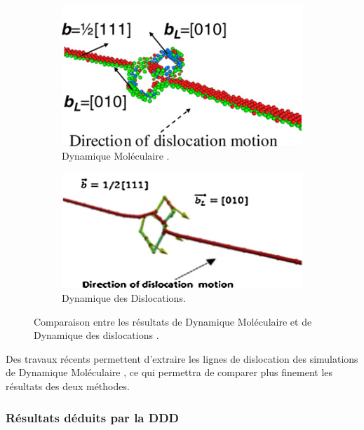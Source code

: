 \documentclass[11pt,class=article,float=false,crop=false]{standalone}
\begin{document}
\begin{figure}[H]
	\centering
	\begin{subfigure}[b]{0.49\textwidth}
		\centering
		\includegraphics[height=0.15\textheight]{img/comparaison-xshi-md}
		\caption[Dynamique Moléculaire]{Dynamique Moléculaire .}
	\end{subfigure}
	\begin{subfigure}[b]{0.49\textwidth}
		\centering
		\includegraphics[height=0.15\textheight]{img/comparaison-xshi-dd}
		\caption{Dynamique des Dislocations.}
	\end{subfigure}
	\caption[Comparaisons DD / MD]{Comparaison entre les résultats de Dynamique Moléculaire et de Dynamique des dislocations .}
	\label{fig:comparaison_md}
\end{figure}

Des travaux récents permettent d'extraire les lignes de dislocation des simulations de Dynamique Moléculaire , ce qui permettra de comparer plus finement les résultats des deux méthodes.

\subsubsection{Résultats déduits par la DDD}
\label{sec:resultats ddd}
\end{document}

